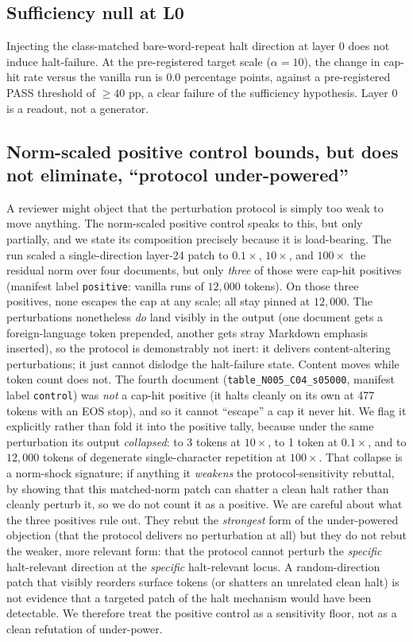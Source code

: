\documentclass[11pt]{article}
\begin{document}
\subsection{Sufficiency null at L0}

Injecting the class-matched bare-word-repeat halt direction at layer 0 does not induce
halt-failure. At the pre-registered target scale ($\alpha = 10$), the change in cap-hit
rate versus the vanilla run is 0.0 percentage points, against a pre-registered PASS
threshold of $\geq 40$ pp, a clear failure of the sufficiency hypothesis. Layer 0 is a
readout, not a generator.

\subsection{Norm-scaled positive control bounds, but does not eliminate, ``protocol under-powered''}

A reviewer might object that the perturbation protocol is simply too weak to move
anything. The norm-scaled positive control speaks to this, but only partially, and we
state its composition precisely because it is load-bearing. The run scaled a
single-direction layer-24 patch to $0.1\times$, $10\times$, and $100\times$ the
residual norm over four documents, but only \emph{three} of those were cap-hit
positives (manifest label \texttt{positive}: vanilla runs of $12{,}000$ tokens). On
those three positives, none escapes the cap at any scale; all stay pinned at
$12{,}000$. The perturbations nonetheless \emph{do} land visibly in the output (one
document gets a foreign-language token prepended, another gets stray Markdown emphasis
inserted), so the protocol is demonstrably not inert: it delivers content-altering
perturbations; it just cannot dislodge the halt-failure state. Content moves while
token count does not. The fourth document
(\texttt{table\_N005\_C04\_s05000}, manifest label \texttt{control}) was \emph{not} a
cap-hit positive (it halts cleanly on its own at 477 tokens with an EOS stop), and
so it cannot ``escape'' a cap it never hit. We flag it explicitly rather than fold it
into the positive tally, because under the same perturbation its output \emph{collapsed}:
to 3 tokens at $10\times$, to 1 token at $0.1\times$, and to $12{,}000$ tokens of
degenerate single-character repetition at $100\times$. That collapse is a norm-shock
signature; if anything it \emph{weakens} the protocol-sensitivity rebuttal, by showing
that this matched-norm patch can shatter a clean halt rather than cleanly perturb it, so
we do not count it as a positive. We are careful about what the three positives rule out.
They rebut the \emph{strongest} form of the under-powered objection (that the protocol
delivers no perturbation at all) but they do not rebut the weaker, more relevant form:
that the protocol cannot perturb the \emph{specific} halt-relevant direction at the
\emph{specific} halt-relevant locus. A random-direction patch that visibly reorders
surface tokens (or shatters an unrelated clean halt) is not evidence that a targeted
patch of the halt mechanism would have been detectable. We therefore treat the positive
control as a sensitivity floor, not as a clean refutation of under-power.
\end{document}
